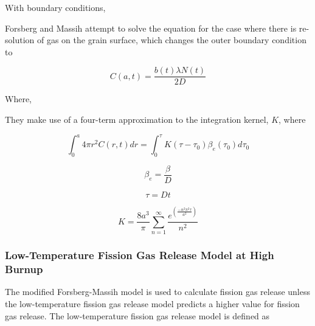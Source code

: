 With boundary conditions,

Forsberg and Massih attempt to solve the equation for the case where there is re-solution of gas on
the grain surface, which changes the outer boundary condition to

\begin{equation}
    \label{eq:forsberg_massih_outer_bc}
    C\left( a,t \right) = \frac{b\left( t \right)\lambda N\left( t \right)}{2D}
\end{equation}


Where,
        

They make use of a four-term approximation to the integration kernel,
\(K\), where

\begin{equation}
    \label{eq:forsberg_massih_integration_kernal}
    \int_{0}^{a}{4\pi r^{2}C\left( r,t \right)dr} = \int_{0}^{\tau}{K\left( \tau - \tau_{0} \right)\beta_{e}\left( \tau_{0} \right){d\tau_{0}}}
\end{equation}

\begin{equation}
    \label{eq:forsberg_massih_beta}
    \beta_{e} = \frac{\beta}{D}
\end{equation}

\begin{equation}
    \label{eq:forsberg_massih_tau}
    \tau = Dt
\end{equation}

\begin{equation}
    \label{eq:forsberg_massih_K}
    K = \frac{8a^{3}}{\pi}\sum_{n = 1}^{\infty}\frac{e^{\left( \frac{- n^{2}\pi^{2}\tau}{a^{2}} \right)}}{n^{2}}
\end{equation}

\subsubsection{Low-Temperature Fission Gas Release Model at High Burnup}\label{section:low-temperature-fission-gas-release-model-at-high-burnup}

The modified Forsberg-Massih model is used to calculate fission gas release unless the
low-temperature fission gas release model predicts a higher value for fission gas release. The
low-temperature fission gas release model is defined as

